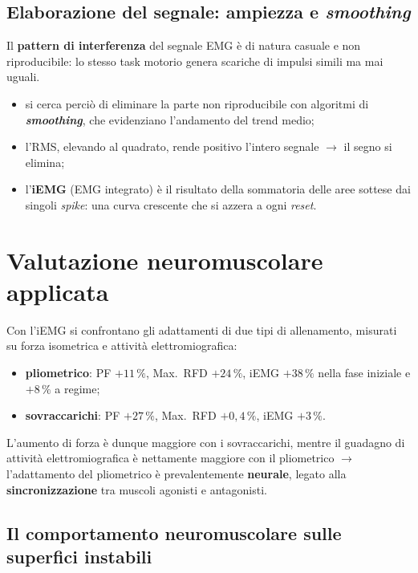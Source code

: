 \subsection{Elaborazione del segnale: ampiezza e \textit{smoothing}}

Il \textbf{pattern di interferenza} del segnale EMG è di natura casuale e non riproducibile: lo
stesso task motorio genera scariche di impulsi simili ma mai uguali.
\begin{itemize}
  \item si cerca perciò di eliminare la parte non riproducibile con algoritmi di
    \textbf{\textit{smoothing}}, che evidenziano l'andamento del trend medio;
  \item l'RMS, elevando al quadrato, rende positivo l'intero segnale $\rightarrow$ il segno si
    elimina;
  \item l'\textbf{iEMG} (EMG integrato) è il risultato della sommatoria delle aree sottese dai
    singoli \textit{spike}: una curva crescente che si azzera a ogni \textit{reset}.
\end{itemize}

\section{Valutazione neuromuscolare applicata}

Con l'iEMG si confrontano gli adattamenti di due tipi di allenamento, misurati su forza isometrica e
attività elettromiografica:
\begin{itemize}
  \item \textbf{pliometrico}: PF $+11\,\%$, Max.\ RFD $+24\,\%$, iEMG $+38\,\%$ nella fase iniziale
    e $+8\,\%$ a regime;
  \item \textbf{sovraccarichi}: PF $+27\,\%$, Max.\ RFD $+0,4\,\%$, iEMG $+3\,\%$.
\end{itemize}
L'aumento di forza è dunque maggiore con i sovraccarichi, mentre il guadagno di attività
elettromiografica è nettamente maggiore con il pliometrico $\rightarrow$ l'adattamento del
pliometrico è prevalentemente \textbf{neurale}, legato alla \textbf{sincronizzazione} tra muscoli
agonisti e antagonisti.

\subsection{Il comportamento neuromuscolare sulle superfici instabili}


